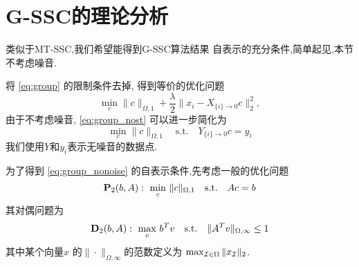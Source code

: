 \section{G-SSC的理论分析}\label{sec:proof_group}
类似于MT-SSC,我们希望能得到G-SSC算法结果
自表示的充分条件,简单起见,本节不考虑噪音.

将 \eqref{eq:group} 的限制条件去掉, 得到等价的优化问题
\begin{equation} \label{eq:group_nost}
  \min_{c} \|c\|_{\Omega,1}+\frac{\lambda}{2} \|x_i-X_{\{i\}\rightarrow
0}c\|_2^2,
\end{equation}
由于不考虑噪音, \eqref{eq:group_nost} 可以进一步简化为
\begin{equation} \label{eq:group_nonoise}
    \min_{c} \|c\|_{\Omega,1} \quad\text{s.t.}\quad
    Y_{\{i\}\rightarrow 0} c=y_i
\end{equation}
我们使用$Y$和$y_i$表示无噪音的数据点.

为了得到 \eqref{eq:group_nonoise} 的自表示条件,先考虑一般的优化问题
\[
  \mathbf{P}_2(b,A): \,\, \min_c\, \| c\|_{\Omega,1} \quad \text{s.t.}\quad Ac = b
\]
其对偶问题为 
\[
  \mathbf{D}_2(b,A): \,\, \max_{v}\, b^T v \quad
  \text{s.t.}\quad \|A^Tv\|_{\Omega,\infty} \leq 1
\]
其中某个向量$x$ 的$\|\cdot\|_{\Omega, \infty}$的范数定义为
$\max_{\mathcal{I} \in \Omega} \|x_{\mathcal{I}}\|_2$.

